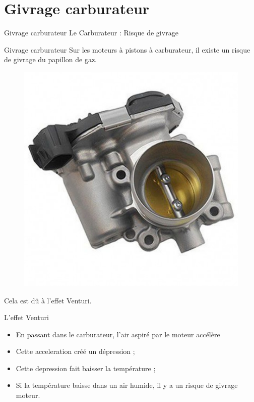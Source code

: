 \documentclass{beamer}
\begin{document}
\section{Givrage carburateur} 
\begin{frame}{Givrage carburateur}
  \LARGE{Le Carburateur : Risque de givrage}
\end{frame}
\begin{frame}{Givrage carburateur} 
  Sur les moteurs à pistons à carburateur, il existe un risque de
  givrage du papillon de gaz.

  \pause
  \begin{figure}
    \centering
    \includegraphics[scale=0.5]{images/papillon-gaz.jpg}
  \end{figure}

  \pause
  Cela est dû à l'effet Venturi.
\end{frame}

\begin{frame}{L'effet Venturi}
  \begin{itemize}
    \item En passant dans le carburateur, l'air aspiré par le moteur accélère \pause
    \item Cette acceleration créé un dépression ; \pause
    \item Cette depression fait baisser la température ; \pause
    \item Si la température baisse dans un air humide, il y a un risque de givrage moteur.
  \end{itemize}
\end{frame}
\end{document}
